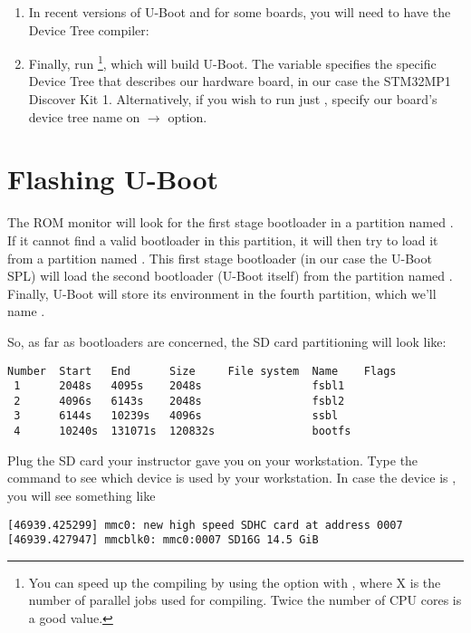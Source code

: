 \begin{enumerate}
\item In recent versions of U-Boot and for some boards, you will
  need to have the Device Tree compiler:


\item Finally, run \footnote{You can speed up the
    compiling by using the  option with , where X
    is the number of parallel jobs used for compiling. Twice the
    number of CPU cores is a good value.}, which will build
  U-Boot. The  variable specifies the specific
  Device Tree that describes our hardware board, in our case the
  STM32MP1 Discover Kit 1. Alternatively, if you wish to run just ,
  specify our board's device tree name on
   $\rightarrow$ 
  option.
\end{enumerate}

\section{Flashing U-Boot}

The ROM monitor will look for the first stage bootloader in a
partition named . If it cannot find a valid bootloader in
this partition, it will then try to load it from a partition named
. This first stage bootloader (in our case the U-Boot SPL)
will load the second bootloader (U-Boot itself) from the partition
named . Finally, U-Boot will store its environment in the
fourth partition, which we'll name .

So, as far as bootloaders are concerned, the SD card partitioning will
look like:

\begin{verbatim}
Number  Start   End      Size     File system  Name    Flags
 1      2048s   4095s    2048s                 fsbl1
 2      4096s   6143s    2048s                 fsbl2
 3      6144s   10239s   4096s                 ssbl
 4      10240s  131071s  120832s               bootfs
\end{verbatim}

Plug the SD card your instructor gave you on your workstation. Type
the  command to see which device is used by your
workstation. In case the device is , you will see
something like

\begin{verbatim}
[46939.425299] mmc0: new high speed SDHC card at address 0007
[46939.427947] mmcblk0: mmc0:0007 SD16G 14.5 GiB
\end{verbatim}


